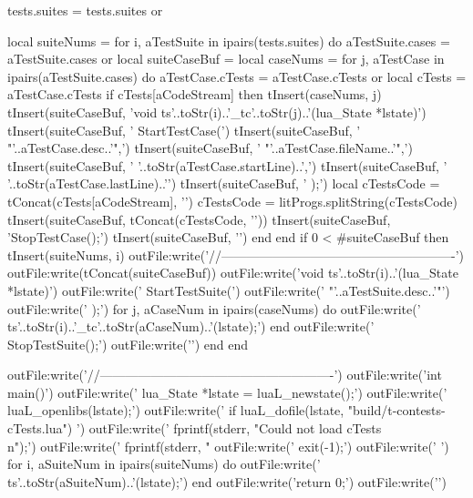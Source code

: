   tests.suites = tests.suites or { }

  local suiteNums = { }
  for i, aTestSuite in ipairs(tests.suites) do
    aTestSuite.cases = aTestSuite.cases or { }
    local suiteCaseBuf = { }
    local caseNums     = { }
    for j, aTestCase in ipairs(aTestSuite.cases) do
      aTestCase.cTests = aTestCase.cTests or { }
      local cTests     = aTestCase.cTests
      if cTests[aCodeStream] then
        tInsert(caseNums, j)
        tInsert(suiteCaseBuf, 'void ts'..toStr(i)..'_tc'..toStr(j)..'(lua_State *lstate){\n\n')
        tInsert(suiteCaseBuf, '  StartTestCase(\n')
        tInsert(suiteCaseBuf, '    "'..aTestCase.desc..'",\n')
        tInsert(suiteCaseBuf, '    "'..aTestCase.fileName..'",\n')
        tInsert(suiteCaseBuf, '    '..toStr(aTestCase.startLine)..',\n')
        tInsert(suiteCaseBuf, '    '..toStr(aTestCase.lastLine)..'\n')
        tInsert(suiteCaseBuf, '  );\n\n  ')
        local cTestsCode = tConcat(cTests[aCodeStream], '\n')
        cTestsCode       = litProgs.splitString(cTestsCode)
        tInsert(suiteCaseBuf, tConcat(cTestsCode, '\n\n  '))
        tInsert(suiteCaseBuf, '\n\n  StopTestCase();\n\n')
        tInsert(suiteCaseBuf, '}\n\n')
      end
    end
    if 0 < #suiteCaseBuf then
      tInsert(suiteNums, i)
      outFile:write('//-------------------------------------------------------\n')
      outFile:write(tConcat(suiteCaseBuf))
      outFile:write('void ts'..toStr(i)..'(lua_State *lstate){\n\n')
      outFile:write('  StartTestSuite(\n')
      outFile:write('    "'..aTestSuite.desc..'"\n')
      outFile:write('  );\n\n')
      for j, aCaseNum in ipairs(caseNums) do
        outFile:write('  ts'..toStr(i)..'_tc'..toStr(aCaseNum)..'(lstate);\n\n')
      end
      outFile:write('  StopTestSuite();\n\n')
      outFile:write('}\n\n')
    end
  end

  outFile:write('//-------------------------------------------------------\n')
  outFile:write('int main(){\n\n')
  outFile:write('  lua_State *lstate = luaL_newstate();\n')
  outFile:write('  luaL_openlibs(lstate);\n')
  outFile:write('  if luaL_dofile(lstate, "build/t-contests-cTests.lua") {\n')
  outFile:write('    fprintf(stderr, "Could not load cTests\\n");\n')
  outFile:write('    fprintf(stderr, "%
  outFile:write('    exit(-1);\n')
  outFile:write('  }\n\n')
  for i, aSuiteNum in ipairs(suiteNums) do
    outFile:write('  ts'..toStr(aSuiteNum)..'(lstate);\n')
  end
  outFile:write('\n  return 0;\n')
  outFile:write('}\n')

